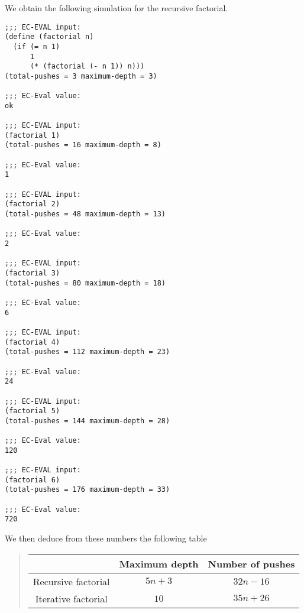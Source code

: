 \documentclass[a4paper,12pt]{article}
\begin{document}
We obtain the following simulation for the recursive factorial.
\begin{lstlisting}
;;; EC-EVAL input:
(define (factorial n)
  (if (= n 1)
      1
      (* (factorial (- n 1)) n)))
(total-pushes = 3 maximum-depth = 3)

;;; EC-Eval value:
ok

;;; EC-EVAL input:
(factorial 1)
(total-pushes = 16 maximum-depth = 8)

;;; EC-Eval value:
1

;;; EC-EVAL input:
(factorial 2)
(total-pushes = 48 maximum-depth = 13)

;;; EC-Eval value:
2

;;; EC-EVAL input:
(factorial 3)
(total-pushes = 80 maximum-depth = 18)

;;; EC-Eval value:
6

;;; EC-EVAL input:
(factorial 4)
(total-pushes = 112 maximum-depth = 23)

;;; EC-Eval value:
24

;;; EC-EVAL input:
(factorial 5)
(total-pushes = 144 maximum-depth = 28)

;;; EC-Eval value:
120

;;; EC-EVAL input:
(factorial 6)
(total-pushes = 176 maximum-depth = 33)

;;; EC-Eval value:
720
\end{lstlisting}

We then deduce from these numbers the following table
\begin{quote}
  \begin{tabular}{|c|c|c|}
    \hline &Maximum depth& Number of pushes \\
    \hline Recursive factorial& $5 n + 3$ & $32 n - 16$ \\
    \hline Iterative factorial& $10$ & $35 n + 26$ \\
    \hline
  \end{tabular}
\end{quote}
\end{document}
